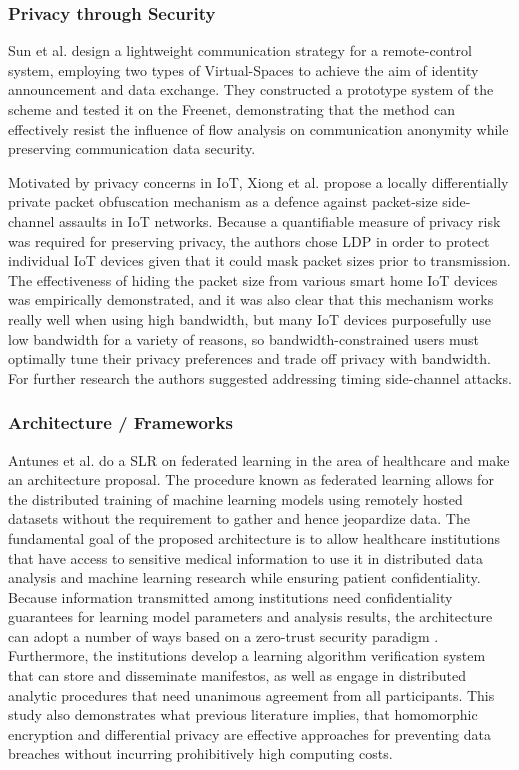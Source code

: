 \subsubsection{Privacy through Security}

Sun et al. \cite{SunSecure} design a lightweight communication strategy
for a remote-control system, employing two types of Virtual-Spaces to achieve
the aim of identity announcement and data exchange. They constructed a prototype
system of the scheme and tested it on the Freenet, demonstrating that the
method can effectively resist the influence of flow analysis on communication
anonymity while preserving communication data security.

Motivated by privacy concerns in IoT, Xiong et al. \cite{xiong2018defending}
propose a locally differentially private packet obfuscation mechanism as
a defence against packet-size side-channel assaults in IoT networks. Because
a quantifiable measure of privacy risk was required for preserving privacy,
the authors chose LDP in order to protect individual
IoT devices given that it could mask packet sizes prior to transmission.
The effectiveness of hiding the packet size from various smart home IoT
devices was empirically demonstrated, and it was also clear that this mechanism
works really well when using high bandwidth, but many IoT devices purposefully
use low bandwidth for a variety of reasons, so bandwidth-constrained users
must optimally tune their privacy preferences and trade off privacy with
bandwidth. For further research the authors suggested addressing timing side-channel
attacks.

\subsubsection{Architecture / Frameworks}

Antunes et al. \cite{AntunesFederated} do a SLR on federated learning in
the area of healthcare and make an architecture proposal. The procedure
known as federated learning allows for the distributed training of machine
learning models using remotely hosted datasets without the requirement to
gather and hence jeopardize data. The fundamental goal of the proposed architecture is
to allow healthcare institutions that have access to sensitive medical information
to use it in distributed data analysis and machine learning research while
ensuring patient confidentiality. Because information transmitted among
institutions need confidentiality guarantees for learning model parameters
and analysis results, the architecture can adopt a number of ways based on
a zero-trust security paradigm \cite{ChenSecurity}. Furthermore, the institutions
develop a learning algorithm verification system that can store and disseminate
manifestos, as well as engage in distributed analytic procedures that need
unanimous agreement from all participants. This study also demonstrates
what previous literature implies, that homomorphic encryption and differential
privacy are effective approaches for preventing data breaches without incurring
prohibitively high computing costs.

